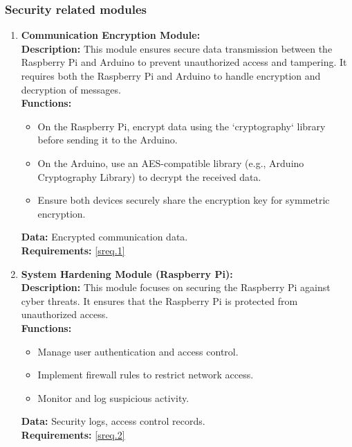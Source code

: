 \subsubsection{Security related modules}
\begin{enumerate}
    \item \textbf{Communication Encryption Module:} \\ 
        \textbf{Description:} This module ensures secure data transmission between the Raspberry Pi and Arduino to prevent unauthorized access and tampering. It requires both the Raspberry Pi and Arduino to handle encryption and decryption of messages. \\ 
        \textbf{Functions:}
        \begin{itemize}
            \item On the Raspberry Pi, encrypt data using the `cryptography` library before sending it to the Arduino.
            \item On the Arduino, use an AES-compatible library (e.g., Arduino Cryptography Library) to decrypt the received data.
            \item Ensure both devices securely share the encryption key for symmetric encryption.
        \end{itemize}
        \textbf{Data:} Encrypted communication data. \\ 
        \textbf{Requirements:} \ref{sreq.1} \\

    \item \textbf{System Hardening Module (Raspberry Pi):} \\ 
        \textbf{Description:} This module focuses on securing the Raspberry Pi against cyber threats. It ensures that the Raspberry Pi is protected from unauthorized access. \\ 
        \textbf{Functions:}
        \begin{itemize}
            \item Manage user authentication and access control.
            \item Implement firewall rules to restrict network access.
            \item Monitor and log suspicious activity.
        \end{itemize}
        \textbf{Data:} Security logs, access control records. \\ 
        \textbf{Requirements:} \ref{sreq.2} \\
\end{enumerate}

